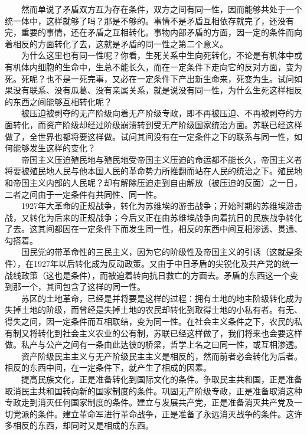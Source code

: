 \documentclass[cn,11pt,chinese]{elegantbook}
\begin{document}
　　然而单说了矛盾双方互为存在条件，双方之间有同一性，因而能够共处于一个统一体中，这样就够了吗？那是不够的。事情不是矛盾互相依存就完了，还没有完，重要的事情，还在矛盾之互相转化。事物内部矛盾的方面，因一定的条件而向着相反的方面转化了去，这就是矛盾的同一性之第二个意义。\\
　　为什么这里也有同一性呢？你看，生死关系中生向死转化，不论是有机体中或有机体内细胞的生命中，生总不能长久，而在一定条件下走向它的反对方面，变为死。死呢？也不是一死完事，又必在一定条件下产出新生命来，死变为生。试问如果没有联系、没有瓜葛、没有亲属关系，就是说没有同一性，为什么生死这样相反的东西之间能够互相转化呢？\\
　　被压迫被剥夺的无产阶级向着无产阶级专政，即不再被压迫、不再被剥夺的方面转化，而资产阶级却经过阶级崩溃转到受无产阶级国家统治方面。苏联已经这样做了，全世界也都将要这样做。试问其间没有在一定条件之下的联系与同一性，如何能够发生这样的变化？\\
　　帝国主义压迫殖民地与殖民地受帝国主义压迫的命运都不能长久，帝国主义者将要被殖民地人民与他本国人民的革命势力所推翻而站在人民的统治之下。殖民地和帝国主义内部的人民呢？却有解除压迫走到自由解放（被压迫的反面）之一日，二者之间由于一定条件有共同性、同一性。\\
　　1927年大革命的正规战争，转化为苏维埃的游击战争；开始时期的苏维埃游击战，又转化为后来的正规战争；今后又正在由苏维埃战争向着抗日的民族战争转化了去。这其间都因在一定条件下而发生同一性，相反的东西中间互相渗透、贯通、勾搭着。\\
　　国民党的带革命性的三民主义，因为它的阶级性及帝国主义的引诱（这就是条件），在1927年以后转化成为反动政策。又由于中日矛盾的尖锐化及共产党的统一战线政策（这也是条件），而被迫着转向抗日救亡的方面去。矛盾的东西这一个变到那一个，其间包含了这样的同一性。\\
　　苏区的土地革命，已经是并将要是这样的过程：拥有土地的地主阶级转化成为失掉土地的阶级，而曾经是失掉土地的农民却转化到取得士地的小私有者。有无、得失之间，因一定条件而互相联结，变为同一性。在社会主义条件之下，农民的私有制又将转化到社会主义农业的公有制，苏联已经这样做了，我们将来也会要这样做。私产与公产之间有一条由此达彼的桥梁，哲学上名之曰同一性，或互相渗透。\\
　　资产阶级民主主义与无产阶级民主主义是相反的，然而前者必会转化为后者。相反的东西中间，在一定条件下，就产生了相成的因素。\\
　　提高民族文化，正是准备转化到国际文化的条件。争取民主共和国，正是准备取消民主共和国转向新的国家制度的条件。巩固无产阶级专政，正是准备取消这种专政走到消灭任何国家制度的条件。建立与发展共产党，正是准备消灭共产党及一切党派的条件。建立革命军进行革命战争，正是准备了永远消灭战争的条件。这许多相反的东西，却同时又是相成的东西。\\
\end{document}
